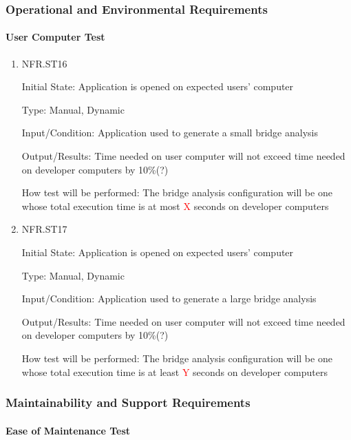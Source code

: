 \documentclass[12pt, titlepage]{article}
\begin{document}
\subsubsection{Operational and Environmental Requirements}
		
\paragraph{User Computer Test}

\begin{enumerate}

\item{NFR.ST16\\}

Initial State: Application is opened on expected users' computer

Type: Manual, Dynamic

Input/Condition: Application used to generate a small bridge analysis

Output/Results: Time needed on user computer will not exceed time needed on developer computers by 10\%(?)

How test will be performed: The bridge analysis configuration will be one whose total execution time is at most \textcolor{red}{X} seconds on developer computers

\item{NFR.ST17\\}

Initial State: Application is opened on expected users' computer

Type: Manual, Dynamic

Input/Condition: Application used to generate a large bridge analysis

Output/Results: Time needed on user computer will not exceed time needed on developer computers by 10\%(?)

How test will be performed: The bridge analysis configuration will be one whose total execution time is at least \textcolor{red}{Y} seconds on developer computers

\end{enumerate}

\subsubsection{Maintainability and Support Requirements}
		
\paragraph{Ease of Maintenance Test}
\end{document}
